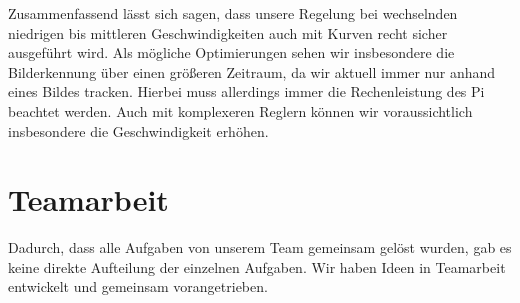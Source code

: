 \documentclass[10pt]{article}
\begin{document}
Zusammenfassend lässt sich sagen, dass unsere Regelung bei wechselnden niedrigen bis mittleren Geschwindigkeiten auch mit Kurven recht sicher ausgeführt wird.
Als mögliche Optimierungen sehen wir insbesondere die Bilderkennung über einen größeren Zeitraum, da wir aktuell immer nur anhand eines Bildes tracken.
Hierbei muss allerdings immer die Rechenleistung des Pi beachtet werden.
Auch mit komplexeren Reglern können wir voraussichtlich insbesondere die Geschwindigkeit erhöhen.

\section{Teamarbeit}
Dadurch, dass alle Aufgaben von unserem Team gemeinsam gelöst wurden, gab es keine direkte Aufteilung der einzelnen Aufgaben. Wir haben Ideen in Teamarbeit entwickelt und gemeinsam vorangetrieben.
\end{document}
